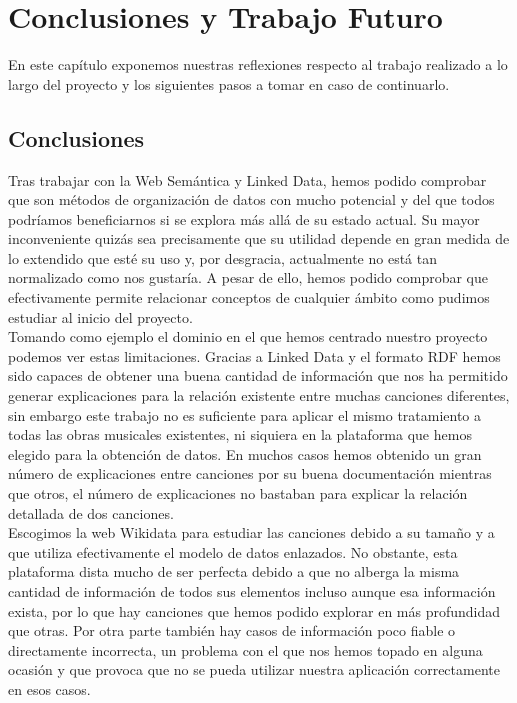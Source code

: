 \chapter{Conclusiones y Trabajo Futuro}
\label{cap:conclusiones}

En este capítulo exponemos nuestras reflexiones respecto al trabajo realizado a lo largo del proyecto y los siguientes pasos a tomar en caso de continuarlo.\\

\section{Conclusiones}

Tras trabajar con la Web Semántica y Linked Data, hemos podido comprobar que son métodos de organización de datos con mucho potencial y del que todos podríamos beneficiarnos si se explora más allá de su estado actual. Su mayor inconveniente quizás sea precisamente que su utilidad depende en gran medida de lo extendido que esté su uso y, por desgracia, actualmente no está tan normalizado como nos gustaría. A pesar de ello, hemos podido comprobar que efectivamente permite relacionar conceptos de cualquier ámbito como pudimos estudiar al inicio del proyecto.\\

Tomando como ejemplo el dominio en el que hemos centrado nuestro proyecto podemos ver estas limitaciones. Gracias a Linked Data y el formato RDF hemos sido capaces de obtener una buena cantidad de información que nos ha permitido generar explicaciones para la relación existente entre muchas canciones diferentes, sin embargo este trabajo no es suficiente para aplicar el mismo tratamiento a todas las obras musicales existentes, ni siquiera en la plataforma que hemos elegido para la obtención de datos. En muchos casos hemos obtenido un gran número de explicaciones entre canciones por su buena documentación mientras que otros, el número de explicaciones no bastaban para explicar la relación detallada de dos canciones.\\

Escogimos la web Wikidata para estudiar las canciones debido a su tamaño y a que utiliza efectivamente el modelo de datos enlazados. No obstante, esta plataforma dista mucho de ser perfecta debido a que no alberga la misma cantidad de información de todos sus elementos incluso aunque esa información exista, por lo que hay canciones que hemos podido explorar en más profundidad que otras. Por otra parte también hay casos de información poco fiable o directamente incorrecta, un problema con el que nos hemos topado en alguna ocasión y que provoca que no se pueda utilizar nuestra aplicación correctamente en esos casos.\\

